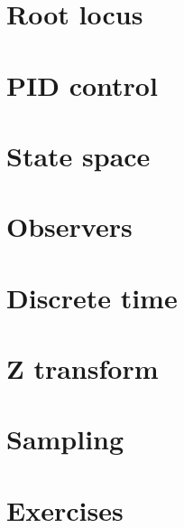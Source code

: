 \documentclass[11pt,a4paper]{article}
\begin{document}
\section{Root locus} \lipsum[11]
\section{PID control} \lipsum[12]
\section{State space} \lipsum[13]
\section{Observers} \lipsum[14]
\section{Discrete time} \lipsum[15]
\section{Z transform} \lipsum[16]
\section{Sampling} \lipsum[17]
\section{Exercises} \lipsum[18]
\end{document}
